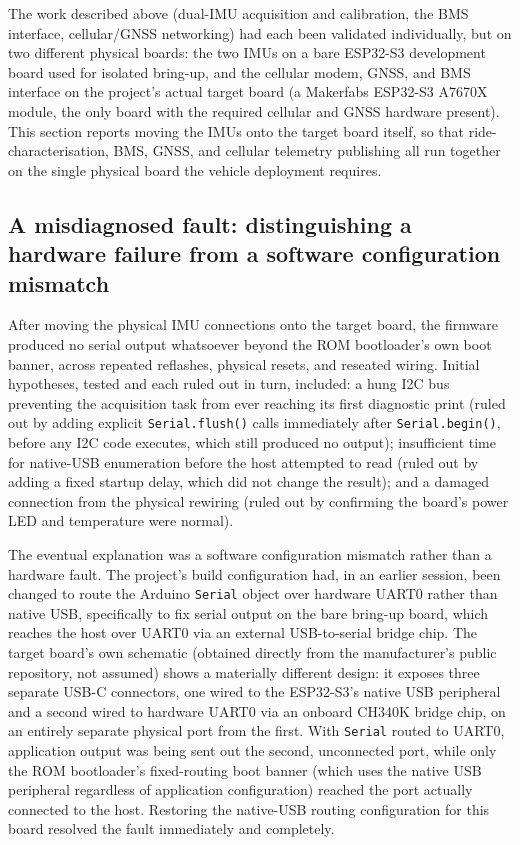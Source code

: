 The work described above (dual-IMU acquisition and calibration, the BMS interface, cellular/GNSS networking) had each been validated individually, but on two different physical boards: the two IMUs on a bare ESP32-S3 development board used for isolated bring-up, and the cellular modem, GNSS, and BMS interface on the project's actual target board (a Makerfabs ESP32-S3 A7670X module, the only board with the required cellular and GNSS hardware present). This section reports moving the IMUs onto the target board itself, so that ride-characterisation, BMS, GNSS, and cellular telemetry publishing all run together on the single physical board the vehicle deployment requires.

\subsection{A misdiagnosed fault: distinguishing a hardware failure from a software configuration mismatch}

After moving the physical IMU connections onto the target board, the firmware produced no serial output whatsoever beyond the ROM bootloader's own boot banner, across repeated reflashes, physical resets, and reseated wiring. Initial hypotheses, tested and each ruled out in turn, included: a hung I2C bus preventing the acquisition task from ever reaching its first diagnostic print (ruled out by adding explicit \texttt{Serial.flush()} calls immediately after \texttt{Serial.begin()}, before any I2C code executes, which still produced no output); insufficient time for native-USB enumeration before the host attempted to read (ruled out by adding a fixed startup delay, which did not change the result); and a damaged connection from the physical rewiring (ruled out by confirming the board's power LED and temperature were normal).

The eventual explanation was a software configuration mismatch rather than a hardware fault. The project's build configuration had, in an earlier session, been changed to route the Arduino \texttt{Serial} object over hardware UART0 rather than native USB, specifically to fix serial output on the bare bring-up board, which reaches the host over UART0 via an external USB-to-serial bridge chip. The target board's own schematic (obtained directly from the manufacturer's public repository, not assumed) shows a materially different design: it exposes three separate USB-C connectors, one wired to the ESP32-S3's native USB peripheral and a second wired to hardware UART0 via an onboard CH340K bridge chip, on an entirely separate physical port from the first. With \texttt{Serial} routed to UART0, application output was being sent out the second, unconnected port, while only the ROM bootloader's fixed-routing boot banner (which uses the native USB peripheral regardless of application configuration) reached the port actually connected to the host. Restoring the native-USB routing configuration for this board resolved the fault immediately and completely.

